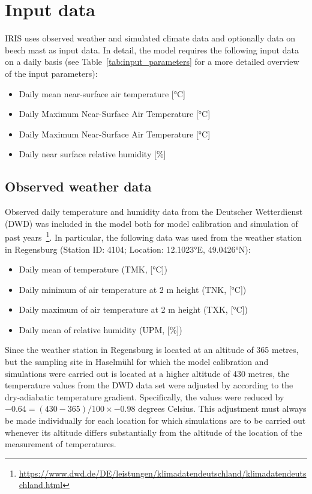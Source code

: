 \documentclass[a4paper, 11pt]{scrartcl}
\begin{document}
\section{Input data}\label{input_data}
IRIS uses observed weather and simulated climate data and optionally data on beech mast as input data. In detail, the model requires the following input data on a daily basis (see Table~\ref{tab:input_parameters} for a more detailed overview of the input parameters):

\begin{itemize}[noitemsep]
\item Daily mean near-surface air temperature [°C]
\item Daily Maximum Near-Surface Air Temperature [°C]
\item Daily Maximum Near-Surface Air Temperature [°C]
\item Daily near surface relative humidity [\%]
\end{itemize}

\subsection{Observed weather data} 
Observed daily temperature and humidity data from the Deutscher Wetterdienst (DWD) was included in the model both for model calibration and simulation of past years~\footnote{\url{https://www.dwd.de/DE/leistungen/klimadatendeutschland/klimadatendeutschland.html}}. In particular, the following data was used from the weather station in Regensburg (Station ID: 4104; Location: 12.1023°E, 49.0426°N):

\begin{itemize}[noitemsep]
	\item Daily mean of temperature (TMK, [°C])
	\item Daily minimum of air temperature at 2 m height (TNK, [°C])
	\item Daily maximum of air temperature at 2 m height (TXK, [°C])
	\item Daily mean of relative humidity (UPM, [\%])
\end{itemize}

Since the weather station in Regensburg is located at an altitude of 365 metres, but the sampling site in Haselmühl for which the model calibration and simulations were carried out is located at a higher altitude of 430 metres, the temperature values from the DWD data set were adjusted by according to the dry-adiabatic temperature gradient. Specifically, the values were reduced by $-0.64 = (430 - 365) / 100 \times -0.98$ degrees Celsius. This adjustment must always be made individually for each location for which simulations are to be carried out whenever its altitude differs substantially from the altitude of the location of the measurement of temperatures.
\end{document}
